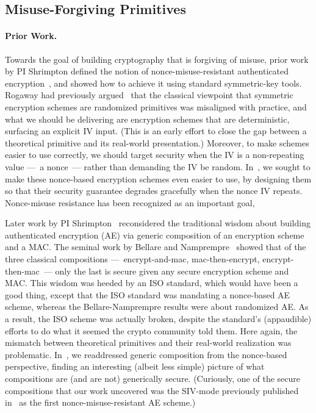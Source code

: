 \subsection{Misuse-Forgiving Primitives}

\paragraph{Prior Work.}
Towards the goal of building cryptography that is forgiving of misuse, prior
work by PI Shrimpton defined the notion of nonce-misuse-resistant authenticated
encryption~\cite{RS06}, and showed how to achieve it using standard
symmetric-key tools.  Rogaway had previously argued~\cite{xxx} that the
classical viewpoint that symmetric encryption schemes are randomized primitives
was misaligned with practice, and what we should be delivering are encryption
schemes that are deterministic, surfacing an explicit IV input. (This is an
early effort to close the gap between a theoretical primitive and its real-world
presentation.)  Moreover, to make schemes easier to use correctly, we should
target security when the IV is a non-repeating value ---~a nonce~--- rather than
demanding the IV be random.  In~\cite{RS06}, we sought to make these nonce-based
encryption schemes even easier to use, by designing them so that their security
guarantee degrades gracefully when the nonce IV repeats.  Nonce-misuse
resistance has been recognized as an important goal,  

Later work by PI Shrimpton~\cite{NRS} reconsidered the traditional wisdom about
building authenticated encryption (AE) via generic composition of an encryption
scheme and a MAC.   The seminal work by Bellare and Namprempre~\cite{BN} showed
that of the three classical compositions ---~encrypt-and-mac, mac-then-encrypt,
encrypt-then-mac~--- only the last is secure given any secure encryption scheme
and MAC.   This wisdom was heeded by an ISO standard, which would have been a
good thing, except that the ISO standard was mandating a nonce-based AE scheme,
whereas the Bellare-Namprempre results were about randomized AE.  As a result,
the ISO scheme was actually broken, despite the standard's (appaudible) efforts
to do what it seemed the crypto community told them.  Here again, the mismatch
between theoretical primitives and their real-world realization was problematic.
In~\cite{NRS}, we readdressed generic composition from the nonce-based
perspective, finding an interesting (albeit less simple) picture of what
compositions are (and are not) generically secure.  (Curiously, one of the
secure compositions that our work uncovered was the SIV-mode previously
published in~\cite{RS06} as the first nonce-misuse-resistant AE scheme.)

